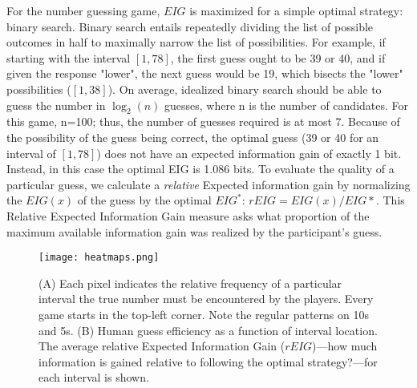 \documentclass[10pt,letterpaper]{article}
\begin{document}
For the number guessing game, $EIG$ is maximized for a simple optimal strategy: binary search. Binary search entails repeatedly dividing the list of possible outcomes in half to maximally narrow the list of possibilities. 
For example, if starting with the interval $[1, 78]$, the first guess ought to be 39 or 40, and if given the response "lower", the next guess would be 19, which bisects the "lower" possibilities ($[1, 38]$). 
On average, idealized binary search should be able to guess the number in $\log_2(n)$ guesses, where n is the number of candidates. For this game, n=100; thus, the number of guesses required is at most 7. 
Because of the possibility of the guess being correct, the optimal guess (39 or 40 for an interval of $[1, 78]$) does not have an expected information gain of exactly 1 bit.
Instead, in this case the optimal EIG is 1.086 bits. 
To evaluate the quality of a particular guess, we calculate a \textit{relative} Expected information gain by normalizing the $EIG(x)$ of the guess by the optimal $EIG^*$: $rEIG = EIG(x) / EIG*$.
This Relative Expected Information Gain measure asks what proportion of the maximum available information gain was realized by the participant's guess.




\begin{figure*}[t]
\begin{center}
    \texttt{[image: heatmaps.png]}
\end{center}
    \vspace{-6mm}
    \caption{(A) Each pixel indicates the relative frequency of a particular interval the true number must be encountered by the players. Every game starts in the top-left corner. Note the regular patterns on 10s and 5s.
    (B) Human guess efficiency as a function of interval location. The average relative Expected Information Gain ($rEIG$)---how much information is gained relative to following the optimal strategy?---for each interval is shown.
}
    \label{fig:heatmap}
    \vspace{-2mm}
\end{figure*}
\end{document}
